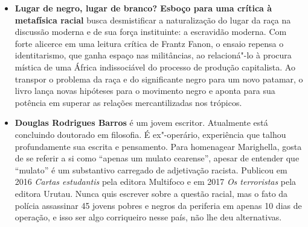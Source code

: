 \begin{itemize}


\item \textbf{Lugar de negro, lugar de branco? Esboço para uma crítica à metafísica racial} busca desmistificar a naturalização do lugar da raça na discussão moderna e de sua força instituinte: a escravidão moderna. Com forte alicerce em uma leitura crítica de Frantz Fanon, o ensaio repensa o identitarismo, que ganha espaço nas militâncias, ao relacioná"-lo à procura mística de uma África indissociável do processo de produção capitalista.
 Ao transpor o problema da raça e do significante negro para um novo patamar, o livro lança novas hipóteses para o movimento negro e aponta para sua potência em superar as relações mercantilizadas nos trópicos.
  
\item \textbf{Douglas Rodrigues Barros} é um jovem escritor. Atualmente está concluindo doutorado
em filosofia. É ex"-operário, experiência que talhou profundamente sua escrita e
pensamento. Para homenagear Marighella, gosta de se referir a si como ``apenas um
mulato cearense'', apesar de entender que ``mulato'' é um substantivo carregado de
adjetivação racista. Publicou em 2016 \emph{Cartas estudantis} pela editora Multifoco e em
2017 \emph{Os terroristas} pela editora Urutau. Nunca quis escrever sobre a questão racial, mas
o fato da polícia assassinar 45 jovens pobres e negros da periferia em apenas 10 dias de
operação, e isso ser algo corriqueiro nesse país, não lhe deu alternativas.

\end{itemize}
